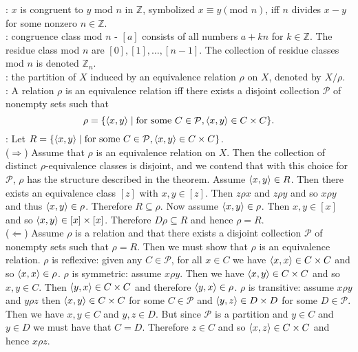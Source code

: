 \documentclass[12pt]{book}
\begin{document}
: $x$ is congruent to $y$ mod $n$ in $\mathbb{Z}$, symbolized $x \equiv y (\text{mod }n)$, iff $n$ divides $x-y$ for some nonzero $n\in\mathbb{Z}$.\\
: congruence class mod $n$ - $[a]$ consists of all numbers $a + kn$ for $k\in\mathbb{Z}$. The residue class mod $n$ are $[0], [1], \dots, [n-1]$. The collection of residue classes mod $n$ is denoted $\mathbb{Z}_n$.\\
: the partition of $X$ induced by an equivalence relation $\rho$ on $X$, denoted by $X/\rho$.\\

: A relation $\rho$ is an equivalence relation iff there exists a disjoint collection $\mathcal{P}$ of nonempty sets such that $$\rho = \{\langle x,y\rangle \mid \text{for some } C\in\mathcal{P}, \langle x,y\rangle\in C\times C\}.$$
: Let $R = \{\langle x,y\rangle \mid \text{for some } C\in\mathcal{P}, \langle x,y\rangle\in C\times C\}$.\\($\Rightarrow$) Assume that $\rho$ is an equivalence relation on $X$. Then the collection of distinct $\rho$-equivalence classes is disjoint, and we contend that with this choice for $\mathcal{P}$, $\rho$ has the structure described in the theorem. Assume $\langle x,y\rangle\in R$. Then there exists an equivalence class $[z]$ with $x,y\in [z]$. Then $z\rho x$ and $z\rho y$ and so $x\rho y$ and thus $\langle x,y\rangle\in\rho$. Therefore $R \subseteq \rho$. Now assume $\langle x,y\rangle\in\rho$. Then $x,y\in [x]$ and so $\langle x,y\rangle\in [x] \times [x]$. Therefore $D\rho \subseteq R$ and hence $\rho = R$.\\($\Leftarrow$) Assume $\rho$ is a relation and that there exists a disjoint collection $\mathcal{P}$ of nonempty sets such that $\rho = R$. Then we must show that $\rho$ is an equivalence relation. $\rho$ is reflexive: given any $C\in\mathcal{P}$, for all $x\in C$ we have $\langle x,x\rangle\in C \times C$ and so $\langle x,x\rangle\in\rho$. $\rho$ is symmetric: assume $x\rho y$. Then we have $\langle x,y\rangle\in C\times C$ and so $x,y\in C$. Then $\langle y,x\rangle\in C\times C$ and therefore $\langle y,x\rangle\in\rho$. $\rho$ is transitive: assume $x\rho y$ and $y\rho z$ then  $\langle x,y\rangle\in C \times C$ for some $C\in\mathcal{P}$ and $\langle y,z\rangle\in D \times D$ for some $D\in\mathcal{P}$. Then we have $x,y\in C$ and $y,z\in D$. But since $\mathcal{P}$ is a partition and $y\in C$ and $y\in D$ we must have that $C = D$. Therefore $z\in C$ and so $\langle x,z\rangle\in C\times C$ and hence $x\rho z$.
\end{document}
